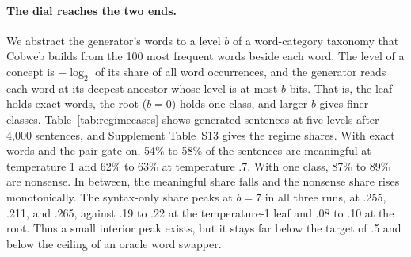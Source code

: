 \documentclass[11pt,letterpaper]{article}
\begin{document}
\paragraph{The dial reaches the two ends.} We abstract the generator's words to a level $b$ of a word-category taxonomy that Cobweb builds from the 100 most frequent words beside each word.
The level of a concept is $-\log_2$ of its share of all word occurrences, and the generator reads each word at its deepest ancestor whose level is at most $b$ bits. That is, the leaf holds exact words, the root ($b=0$) holds one class, and larger $b$ gives finer classes.
Table~\ref{tab:regimecases} shows generated sentences at five levels after 4,000 sentences, and Supplement Table~S13 gives the regime shares.
With exact words and the pair gate on, 54\% to 58\% of the sentences are meaningful at temperature 1 and 62\% to 63\% at temperature .7. With one class, 87\% to 89\% are nonsense. In between, the meaningful share falls and the nonsense share rises monotonically.
The syntax-only share peaks at $b=7$ in all three runs, at .255, .211, and .265, against .19 to .22 at the temperature-1 leaf and .08 to .10 at the root.
Thus a small interior peak exists, but it stays far below the target of .5 and below the ceiling of an oracle word swapper.
\end{document}
